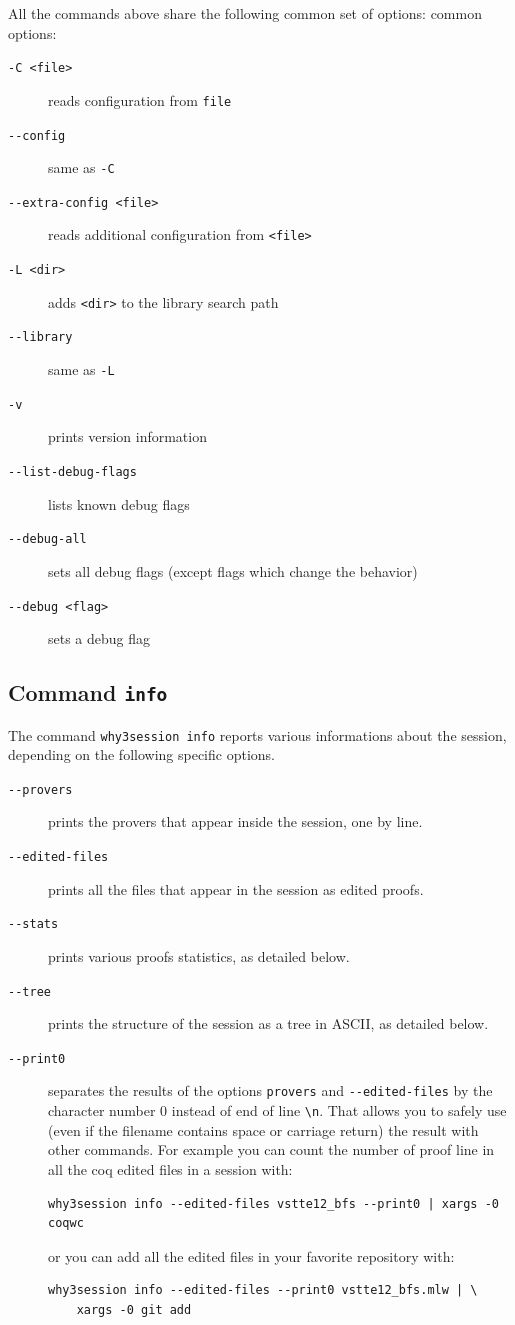 All the commands above share the following common set of options:
common options:
\begin{description}
\item[\texttt{-C <file>}] reads configuration from \texttt{file}
\item[\texttt{-{}-config}]  same as \texttt{-C}
\item[\texttt{-{}-extra-config <file>}] reads additional configuration from \texttt{<file>}
\item[\texttt{-L <dir>}]              adds \texttt{<dir>} to the library search path
\item[\texttt{-{}-library}]             same as \texttt{-L}
\item[\texttt{-v}]                    prints version information
\item[\texttt{-{}-list-debug-flags}]    lists known debug flags
\item[\texttt{-{}-debug-all}]           sets all debug flags (except flags which change the behavior)
\item[\texttt{-{}-debug <flag>}]        sets a debug flag
\end{description}

\subsection{Command \texttt{info}}

The command \texttt{why3session info} reports various informations
about the session, depending on the following specific options.
\begin{description}
\item[\texttt{-{}-provers}] prints the provers that appear inside
  the session, one by line.
\item[\texttt{-{}-edited-files}] prints all the files that appear in
  the session as edited proofs.
\item[\texttt{-{}-stats}] prints various proofs statistics, as
  detailed below.
\item[\texttt{-{}-tree}] prints the structure of the session as a
  tree in ASCII, as detailed below.
\item[\texttt{-{}-print0}] separates the results of the options
  \verb|provers| and \verb|--edited-files| by the character number 0
  instead of end of line \verb|\n|. That allows you to safely use
  (even if the filename contains space or carriage return) the result
  with other commands. For example you can count the number of proof
  line in all the coq edited files in a session with:
\begin{verbatim}
why3session info --edited-files vstte12_bfs --print0 | xargs -0 coqwc
\end{verbatim}
  or you can add all the edited files in your favorite repository
  with:
\begin{verbatim}
why3session info --edited-files --print0 vstte12_bfs.mlw | \
    xargs -0 git add
\end{verbatim}

\end{description}


